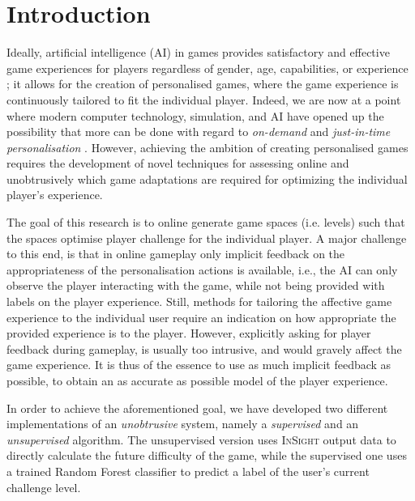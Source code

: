 \documentclass[letterpaper]{article}
\begin{document}
\section{Introduction}

Ideally, artificial intelligence (AI) in games provides satisfactory and effective game experiences for players regardless of gender, age, capabilities, or experience \cite{CharlesMcNeill:2005}; it allows for the creation of personalised games, where the game experience is continuously tailored to fit the individual player. Indeed, we are now at a point where modern computer technology, simulation, and AI have opened up the possibility that more can be done with regard to \emph{on-demand} and \emph{just-in-time personalisation} \cite{riedl2010scalable}. However, achieving the ambition of creating personalised games requires the development of novel techniques for assessing online and unobtrusively which game adaptations are required for optimizing the individual player's experience.

The goal of this research is to online generate game spaces (i.e. levels) such that the spaces optimise player challenge for the individual player. A major challenge to this end, is that in online gameplay only implicit feedback on the appropriateness of the personalisation actions is available, i.e., the AI can only observe the player interacting with the game, while not being provided with labels on the player experience. Still, methods for tailoring the affective game experience to the individual user require an indication on how appropriate the provided experience is to the player. However, explicitly asking for player feedback during gameplay, is usually too intrusive, and would gravely affect the game experience. It is thus of the essence to use as much implicit feedback as possible, to obtain an as accurate as possible model of the player experience.

In order to achieve the aforementioned goal, we have developed two different implementations of an \emph{unobtrusive} system, namely a \emph{supervised} and an \emph{unsupervised} algorithm. The unsupervised version uses \textsc{InSight} output data to directly calculate the future difficulty of the game, while the supervised one uses a trained Random Forest classifier to predict a label of the user's current challenge level.

\end{document}
